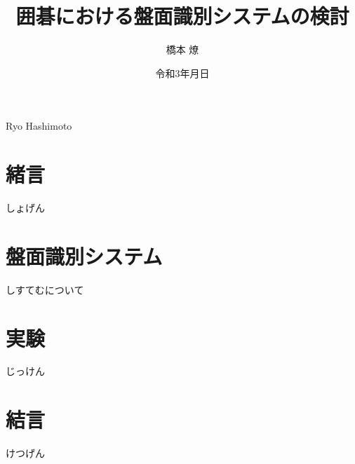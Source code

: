 \documentclass[summary]{nitocs}
\begin{document}
    \title{囲碁における盤面識別システムの検討}
    \author{橋本 燎}{Ryo Hashimoto} %

    \date{令和3年\number\month 月\number\day 日} 

    \maketitle
    \section{緒言} \label{intro}
        しょげん
    \section{盤面識別システム} \label{system}
        しすてむについて

    \section{実験} \label{experiment}
        じっけん

    \section{結言}\label{conclusion}
        けつげん


    \begin{thebibliography}{10}
    \end{thebibliography}
\end{document}
